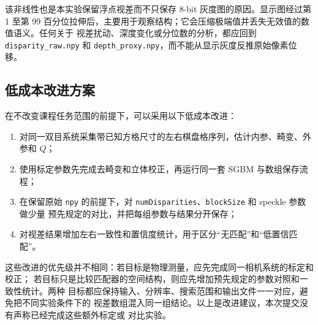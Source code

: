 该非线性也是本实验保留浮点视差而不只保存 8-bit 灰度图的原因。显示图经过第 1 至第
99 百分位拉伸后，主要用于观察结构；它会压缩极端值并丢失无效值的数值语义。任何关于
视差扰动、深度变化或分位数的分析，都应回到 \texttt{disparity\_raw.npy} 和
\texttt{depth\_proxy.npy}，而不能从显示灰度反推原始像素位移。

\subsection{低成本改进方案}

在不改变课程任务范围的前提下，可以采用以下低成本改进：

\begin{enumerate}
  \item 对同一双目系统采集带已知方格尺寸的左右棋盘格序列，估计内参、畸变、外参和 $Q$；
  \item 使用标定参数先完成去畸变和立体校正，再运行同一套 SGBM 与数组保存流程；
  \item 在保留原始 \texttt{npy} 的前提下，对 \texttt{numDisparities}、\texttt{blockSize} 和 speckle 参数做少量
        预先规定的对比，并把每组参数与结果分开保存；
  \item 对视差结果增加左右一致性和置信度统计，用于区分“无匹配”和“低置信匹配”。
\end{enumerate}

这些改进的优先级并不相同：若目标是物理测量，应先完成同一相机系统的标定和校正；
若目标只是比较匹配器的空间结构，则应先增加预先规定的参数对照和一致性统计。两种
目标都应保持输入、分辨率、搜索范围和输出文件一一对应，避免把不同实验条件下的
视差数组混入同一组结论。以上是改进建议，本次提交没有声称已经完成这些额外标定或
对比实验。
